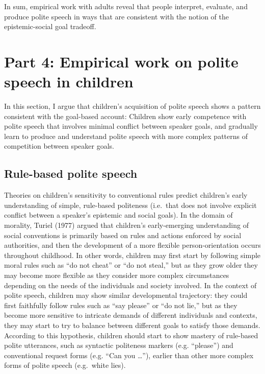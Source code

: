 \documentclass[oneside]{report}
\begin{document}
In sum, empirical work with adults reveal that people interpret,
evaluate, and produce polite speech in ways that are consistent with the
notion of the epistemic-social goal tradeoff.

\section{Part 4: Empirical work on polite speech in
children}\label{part-4-empirical-work-on-polite-speech-in-children}

In this section, I argue that children's acquisition of polite speech
shows a pattern consistent with the goal-based account: Children show
early competence with polite speech that involves minimal conflict
between speaker goals, and gradually learn to produce and understand
polite speech with more complex patterns of competition between speaker
goals.

\subsection{Rule-based polite speech}\label{rule-based-polite-speech}

Theories on children's sensitivity to conventional rules predict
children's early understanding of simple, rule-based politeness
(i.e.~that does not involve explicit conflict between a speaker's
epistemic and social goals). In the domain of morality, Turiel (1977)
argued that children's early-emerging understanding of social
conventions is primarily based on rules and actions enforced by social
authorities, and then the development of a more flexible
person-orientation occurs throughout childhood. In other words, children
may first start by following simple moral rules such as ``do not cheat''
or ``do not steal,'' but as they grow older they may become more
flexible as they consider more complex circumstances depending on the
needs of the individuals and society involved. In the context of polite
speech, children may show similar developmental trajectory: they could
first faithfully follow rules such as ``say please'' or ``do not lie,''
but as they become more sensitive to intricate demands of different
individuals and contexts, they may start to try to balance between
different goals to satisfy those demands. According to this hypothesis,
children should start to show mastery of rule-based polite utterances,
such as syntactic politeness markers (e.g. ``please'') and conventional
request forms (e.g. ``Can you \ldots{}''), earlier than other more
complex forms of polite speech (e.g.~white lies).
\end{document}
